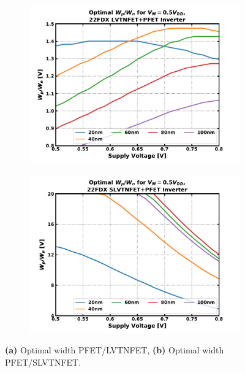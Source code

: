 			\begin{figure}[htb!]
			    \centering
			    \begin{subfigure}{0.5\textwidth}
			        \centering
			        \includegraphics[width=1\textwidth, angle=0]{./figs/design/ratio_lvtnfet_pfet}
			        \caption{ }
			        \label{fig:ratio_lvtn_p}
			    \end{subfigure}%
			    \begin{subfigure}{0.5\textwidth}
			        \centering
			        \includegraphics[width=1\textwidth, angle=0]{./figs/design/ratio_slvtnfet_pfet}
			        \caption{ }
			        \label{fig:ratio_slvtn_p}
			    \end{subfigure}
			    \caption{\textbf{(a)} Optimal width PFET/LVTNFET, \textbf{(b)} Optimal width PFET/SLVTNFET.}
			    \label{fig:opt_ratio}
			\end{figure} 




